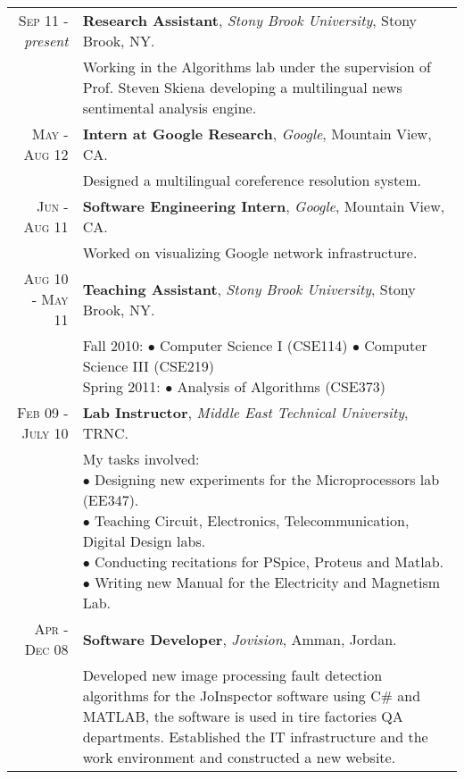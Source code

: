\documentclass[a4paper, oneside, final]{scrartcl}
\newcommand{\twidthb}{12.65cm}
\begin{document}
\begin{tabular}{rm{\twidthb}}
\textsc{Sep 11} - \emph{present}  & \textbf{Research Assistant}, \emph{Stony Brook University}, Stony Brook, NY. \\
                    & \footnotesize{\parbox{\twidthb}{Working in the Algorithms lab under the supervision of Prof. Steven Skiena developing a multilingual news sentimental analysis engine.}}

\\\textsc{May - Aug 12}  & \textbf{Intern at Google Research}, \emph{Google}, Mountain View, CA. \\                    
 & \footnotesize{\parbox{\twidthb}{Designed a multilingual coreference resolution system.}}

\\\textsc{Jun - Aug 11}  & \textbf{Software Engineering Intern}, \emph{Google}, Mountain View, CA. \\
						& \footnotesize{\parbox{\twidthb}{Worked on visualizing Google network infrastructure.}}

\\\textsc{Aug 10 - May 11}  & \textbf{Teaching Assistant}, \emph{Stony Brook University}, Stony Brook, NY. \\
                    & \footnotesize{\parbox{\twidthb}{
                        Fall 2010:
                        $\bullet$ Computer Science I (CSE114)
                        $\bullet$ Computer Science III (CSE219)\\
                        Spring 2011: $\bullet$ Analysis of Algorithms (CSE373)}}

\\\textsc{Feb 09 - July 10}  & \textbf{Lab Instructor}, \emph{Middle East Technical University}, TRNC. \\
                    & \footnotesize{\parbox{\twidthb}{
                        My tasks involved: \\
                        $\bullet$ Designing new experiments for the Microprocessors lab (EE347).\\
                        $\bullet$ Teaching Circuit, Electronics, Telecommunication, Digital Design labs.\\
                        $\bullet$ Conducting recitations for PSpice, Proteus and Matlab.\\
                        $\bullet$ Writing new Manual for the Electricity and Magnetism Lab.}}   

   \\ \textsc{Apr - Dec 08}  & \textbf{Software Developer}, \emph{Jovision}, Amman, Jordan. \\
                         & \footnotesize{Developed new image processing fault detection algorithms for the JoInspector software using C\# and MATLAB, the software is used in tire factories QA departments. Established the IT infrastructure and the work environment and constructed a new website.}

\\ 

\end{tabular}
\end{document}
